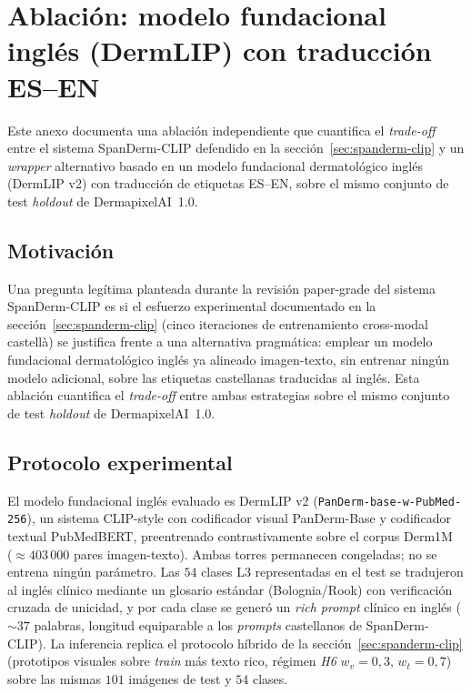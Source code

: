 
\chapter{Ablación: modelo fundacional inglés (DermLIP) con
traducción ES--EN}
\label{cap:anexoi}

Este anexo documenta una ablación independiente que cuantifica el
\emph{trade-off} entre el sistema SpanDerm-CLIP defendido en la
secci\'on~\ref{sec:spanderm-clip} y un \emph{wrapper} alternativo
basado en un modelo fundacional dermatológico inglés (DermLIP v2)
con traducción de etiquetas ES--EN, sobre el mismo conjunto de test
\emph{holdout} de DermapixelAI~1.0.

\section{Motivación}
\label{sec:anexoi-motivacion}

Una pregunta legítima planteada durante la revisión paper-grade
del sistema SpanDerm-CLIP es si el esfuerzo experimental
documentado en la secci\'on~\ref{sec:spanderm-clip} (cinco
iteraciones de entrenamiento cross-modal castellà) se justifica
frente a una alternativa pragmática: emplear un modelo fundacional
dermatológico inglés ya alineado imagen-texto, sin entrenar ningún
modelo adicional, sobre las etiquetas castellanas traducidas al
inglés. Esta ablación cuantifica el \emph{trade-off} entre ambas
estrategias sobre el mismo conjunto de test \emph{holdout} de
DermapixelAI~1.0.

\section{Protocolo experimental}
\label{sec:anexoi-protocolo}

El modelo fundacional inglés evaluado es DermLIP v2
(\texttt{PanDerm-base-w-PubMed-256}), un sistema CLIP-style con
codificador visual PanDerm-Base y codificador textual PubMedBERT,
preentrenado contrastivamente sobre el corpus
Derm1M~\cite{derm1m} ($\approx 403\,000$ pares imagen-texto).
Ambas torres permanecen congeladas; no se entrena ningún
parámetro. Las $54$ clases L3 representadas en el test se
tradujeron al inglés clínico mediante un glosario estándar
(Bolognia/Rook) con verificación cruzada de unicidad, y por cada
clase se generó un \emph{rich prompt} clínico en inglés ($\sim 37$
palabras, longitud equiparable a los \emph{prompts} castellanos
de SpanDerm-CLIP). La inferencia replica el protocolo híbrido de
la secci\'on~\ref{sec:spanderm-clip} (prototipos visuales sobre
\emph{train} más texto rico, régimen \emph{H6} $w_v = 0{,}3$,
$w_t = 0{,}7$) sobre las mismas $101$ imágenes de test y $54$
clases.

